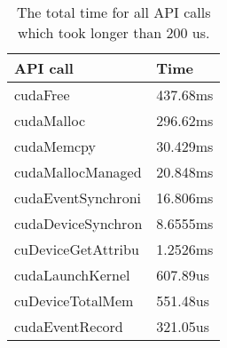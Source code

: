 \documentclass{article}
\begin{document}
\begin{table}[] 
  \centering 
  \begin{tabular}{|l|l|} 
    \hline API call           & Time \\
    \hline cudaFree           & 437.68ms \\
    \hline cudaMalloc         & 296.62ms \\
    \hline cudaMemcpy         & 30.429ms \\
    \hline cudaMallocManaged  & 20.848ms \\
    \hline cudaEventSynchroni & 16.806ms \\
    \hline cudaDeviceSynchron & 8.6555ms \\
    \hline cuDeviceGetAttribu & 1.2526ms \\
    \hline cudaLaunchKernel   & 607.89us \\
    \hline cuDeviceTotalMem   & 551.48us \\
    \hline cudaEventRecord    & 321.05us \\ \hline
  \end{tabular} 
  \caption{The total time for all API calls
  which took longer than 200 us.}
\end{table}
\end{document}
